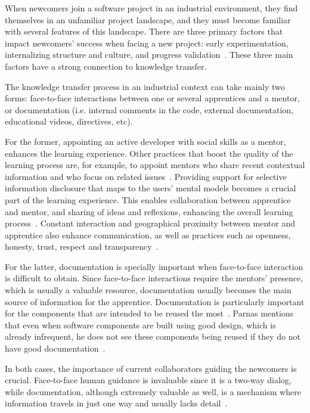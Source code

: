 \documentclass[12pt, letterpaper]{article}
\begin{document}
When newcomers join a software project in an industrial environment, they find themselves in an
unfamiliar project
landscape, and they must become familiar with several features of this landscape.
There are three primary factors that impact newcomers'
success when facing a new project: early experimentation, internalizing structure
and culture, and progress validation~\cite{Dagenais10}. These three main factors
have a strong connection to knowledge transfer. 

The knowledge transfer process in an industrial context can take mainly two forms:
face-to-face interactions between one or several apprentices and a mentor, or documentation 
(i.e. internal comments in the code, external documentation, educational videos, directives, etc). 

For the former, appointing an active developer with social skills
as a mentor, enhances the learning experience. Other practices that boost the quality 
of the learning process are, for example, to appoint mentors who share recent
contextual information and who focus on related issues~\cite{Steinmacher12}. Providing support for selective information disclosure that
maps to the users' mental models becomes a crucial part of the learning
experience. This enables collaboration between apprentice and mentor, and sharing of ideas and reflexions, 
enhancing the overall learning process~\cite{Razavi06}. Constant interaction
and geographical proximity between mentor and apprentice also enhance communication, as well as 
practices such as openness, honesty, trust, respect and transparency~\cite{Whitworth06}. 

For the latter,
documentation is specially important when face-to-face interaction is difficult to obtain.
Since face-to-face interactions
require the mentors' presence, which is usually a valuable resource, documentation usually
becomes the main source of information for the apprentice. Documentation is particularly important 
for the components that are intended to be reused the most~\cite{monperrus11}. Parnas mentions that even
when software components are built using good design, which is already infrequent, he does not see these components being
reused if they do not have good documentation~\cite{brooks95}. 

In both cases, the importance of current collaborators guiding the newcomers is crucial.
Face-to-face human guidance is invaluable since it is a two-way dialog, while documentation,
although extremely valuable as well, is a mechanism
where information travels in just one way and usually lacks detail~\cite{Dagenais10}.
 
\end{document}
